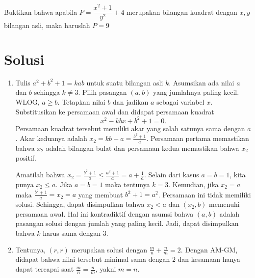 \documentclass[11pt]{scrartcl}
\begin{document}
\begin{problem}
    Buktikan bahwa apabila $P = \dfrac{x^2 + 1}{y^2} + 4$ merupakan bilangan kuadrat dengan $x, y$ bilangan asli, maka haruslah $P = 9$
\end{problem}

\newpage
\section{Solusi}
\begin{enumerate}
    \item Tulis $a^2 + b^2 + 1 = kab$ untuk suatu bilangan asli $k$. Asumsikan ada nilai $a$ dan $b$ sehingga $k \neq 3$. Pilih pasangan $(a, b)$ yang jumlahnya paling kecil. WLOG, $a \geq b$. Tetapkan nilai $b$ dan jadikan $a$ sebagai variabel $x$. Substitusikan ke persamaan awal dan didapat persamaan kuadrat \[x^2 - kbx + b^2 + 1 = 0.\] Persamaan kuadrat tersebut memiliki akar yang salah satunya sama dengan $a$. Akar keduanya adalah $x_2 = kb - a = \frac{b^2 + 1}{a}$. Persamaan pertama memastikan bahwa $x_2$ adalah bilangan bulat dan persamaan kedua memastikan bahwa $x_2$ positif. 
    
    Amatilah bahwa $x_2 = \frac{b^2 + 1}{a} \leq \frac{a^2 + 1}{a} = a + \frac{1}{a}$. Selain dari kasus $a = b = 1$, kita punya $x_2 \leq a$. Jika $a = b = 1$ maka tentunya $k = 3$. Kemudian, jika $x_2 = a$ maka $\frac{b^2 + 1}{a} = x_2 = a$ yang membuat $b^2 + 1 = a^2$. Persamaan ini tidak memiliki solusi. Sehingga, dapat disimpulkan bahwa $x_2 < a$ dan $(x_2, b)$ memenuhi persamaan awal. Hal ini kontradiktif dengan asumsi bahwa $(a, b)$ adalah pasangan solusi dengan jumlah yang paling kecil. Jadi, dapat disimpulkan bahwa $k$ harus sama dengan $3$.
    \item Tentunya, $(r, r)$ merupakan solusi dengan $\frac{m}{n} + \frac{n}{m} = 2$. Dengan AM-GM, didapat bahwa nilai tersebut minimal sama dengan $2$ dan kesamaan hanya dapat tercapai saat $\frac{m}{n} = \frac{n}{m}$, yakni $m = n$. 


\end{enumerate}
\end{document}
